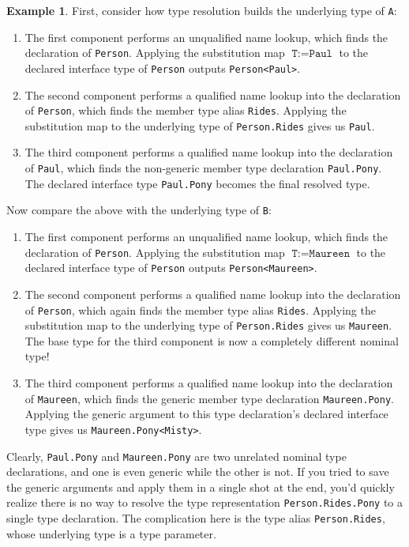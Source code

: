 \documentclass[a4paper,headsepline,bibliography=totoc,toc=flat,fleqn,twoside=semi]{scrbook}
\theoremstyle{definition}
\theoremstyle{definition}
\newtheorem{example}{Example}[chapter]
\theoremstyle{definition}
\begin{document}
\begin{example}
First, consider how type resolution builds the underlying type of \texttt{A}:
\begin{enumerate}
\item The first component performs an unqualified name lookup, which finds the declaration of \texttt{Person}. Applying the substitution map $\texttt{T}:=\texttt{Paul}$ to the declared interface type of \texttt{Person} outputs \texttt{Person<Paul>}.
\item The second component performs a qualified name lookup into the declaration of \texttt{Person}, which finds the member type alias \texttt{Rides}. Applying the substitution map to the underlying type of \texttt{Person.Rides} gives us \texttt{Paul}.
\item The third component performs a qualified name lookup into the declaration of \texttt{Paul}, which finds the non-generic member type declaration \texttt{Paul.Pony}. The declared interface type \texttt{Paul.Pony} becomes the final resolved type.
\end{enumerate}
Now compare the above with the underlying type of \texttt{B}:
\begin{enumerate}
\item The first component performs an unqualified name lookup, which finds the declaration of \texttt{Person}. Applying the substitution map $\texttt{T}:=\texttt{Maureen}$ to the declared interface type of \texttt{Person} outputs \texttt{Person<Maureen>}.
\item The second component performs a qualified name lookup into the declaration of \texttt{Person}, which again finds the member type alias \texttt{Rides}. Applying the substitution map to the underlying type of \texttt{Person.Rides} gives us \texttt{Maureen}. The base type for the third component is now a completely different nominal type!
\item The third component performs a qualified name lookup into the declaration of \texttt{Maureen}, which finds the generic member type declaration \texttt{Maureen.Pony}. Applying the generic argument to this type declaration's declared interface type gives us \texttt{Maureen.Pony<Misty>}.
\end{enumerate}

Clearly, \texttt{Paul.Pony} and \texttt{Maureen.Pony} are two unrelated nominal type declarations, and one is even generic while the other is not. If you tried to save the generic arguments and apply them in a single shot at the end, you'd quickly realize there is no way to resolve the type representation \texttt{Person.Rides.Pony} to a single type declaration. The complication here is the type alias \texttt{Person.Rides}, whose underlying type is a type parameter.

\end{example}
\end{document}
